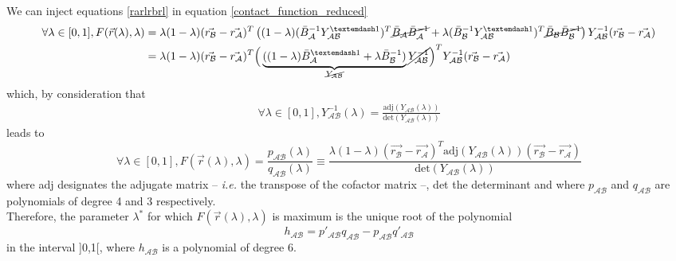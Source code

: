 \documentclass[class=report, float=false, crop=false]{standalone}
\begin{document}
We can inject equations \ref{rarlrbrl} in equation \ref{contact_function_reduced}
\begin{align*}
\forall \lambda \in [0,1], F(\vec{r}(\lambda),\lambda) &= \lambda(1 - \lambda)(\vec{r_{\mathcal{B}}} - \vec{r_{\mathcal{A}}})^T\left((1-\lambda)(\bar{B}_{\mathcal{A}}^{-1}Y_{\mathcal{A}\mathcal{B}}^{—1})^T\cancel{\bar{B}_{\mathcal{A}}\bar{B}_{\mathcal{A}}^{-1}} + \lambda(\bar{B}_{\mathcal{B}}^{-1}Y_{\mathcal{A}\mathcal{B}}^{—1})^T\cancel{\bar{B}_{\mathcal{B}}\bar{B}_{\mathcal{B}}^{-1}}\right)Y_{\mathcal{A}\mathcal{B}}^{-1}(\vec{r_{\mathcal{B}}} - \vec{r_{\mathcal{A}}})\\
&= \lambda(1 - \lambda)(\vec{r_{\mathcal{B}}} - \vec{r_{\mathcal{A}}})^T \Big(\underbrace{((1-\lambda)\bar{B}_{\mathcal{A}}^{—1} + \lambda \bar{B}_{\mathcal{B}}^{-1})}_{\cancel{Y_{\mathcal{A}\mathcal{B}}}}\cancel{Y_{\mathcal{A}\mathcal{B}}^{-1}}\Big)^T Y_{\mathcal{A}\mathcal{B}}^{-1}(\vec{r_{\mathcal{B}}} - \vec{r_{\mathcal{A}}})
\end{align*}
which, by consideration that
\begin{align*}
\forall \lambda \in [0,1], Y_{\mathcal{A}\mathcal{B}}^{-1}(\lambda) = \frac{\text{adj}\left(Y_{\mathcal{A}\mathcal{B}}(\lambda)\right)}{\text{det}\left(Y_{\mathcal{A}\mathcal{B}}(\lambda)\right)}
\end{align*}
leads to
\begin{equation}
\boxed{\forall \lambda \in [0,1], F(\vec{r}(\lambda),\lambda) = \frac{p_{\mathcal{A}\mathcal{B}}(\lambda)}{q_{\mathcal{A}\mathcal{B}}(\lambda)} \equiv \frac{\lambda (1 - \lambda) (\vec{r_{\mathcal{B}}} - \vec{r_{\mathcal{A}}})^T\text{adj}\left(Y_{\mathcal{A}\mathcal{B}}(\lambda)\right)(\vec{r_{\mathcal{B}}} - \vec{r_{\mathcal{A}}})}{\text{det}\left(Y_{\mathcal{A}\mathcal{B}}(\lambda)\right)}}
\end{equation}
where adj designates the adjugate matrix -- \textit{i.e.} the transpose of the cofactor matrix --, det the determinant and where $p_{\mathcal{A}\mathcal{B}}$ and $q_{\mathcal{A}\mathcal{B}}$ are polynomials of degree 4 and 3 respectively.\\

Therefore, the parameter $\lambda^*$ for which $F(\vec{r}(\lambda),\lambda)$ is maximum is the unique root of the polynomial
\begin{equation}
h_{\mathcal{A}\mathcal{B}} = p'_{\mathcal{A}\mathcal{B}}q_{\mathcal{A}\mathcal{B}} - p_{\mathcal{A}\mathcal{B}}q'_{\mathcal{A}\mathcal{B}}
\label{hab}
\end{equation}
in the interval ]0,1[, where $h_{\mathcal{A}\mathcal{B}}$ is a polynomial of degree 6.
\end{document}
